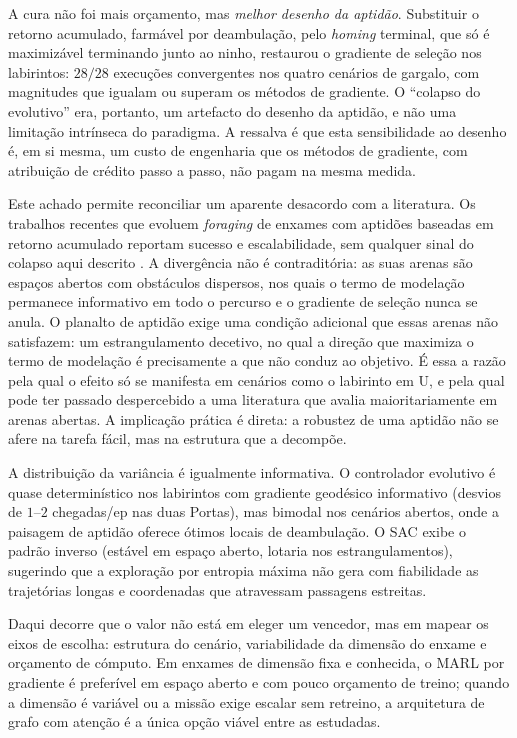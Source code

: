 \documentclass[final,5p,times,twocolumn,authoryear]{elsarticle}
\begin{document}
 A cura não foi mais orçamento, mas \emph{melhor desenho da aptidão}. Substituir o
retorno acumulado, farmável por deambulação, pelo \emph{homing} terminal, que só é
maximizável terminando junto ao ninho, restaurou o gradiente de seleção nos
labirintos: $28/28$ execuções convergentes nos quatro cenários de gargalo, com
magnitudes que igualam ou superam os métodos de gradiente. O
``colapso do evolutivo'' era, portanto, um artefacto do desenho da aptidão, e não
uma limitação intrínseca do paradigma. A ressalva é que esta sensibilidade ao
desenho é, em si mesma, um custo de engenharia que os métodos de gradiente, com
atribuição de crédito passo a passo, não pagam na mesma medida.

 Este achado permite reconciliar um aparente desacordo com a literatura. Os
trabalhos recentes que evoluem \emph{foraging} de enxames com aptidões baseadas em
retorno acumulado reportam sucesso e escalabilidade, sem qualquer sinal do colapso
aqui descrito \citep{zaman2025neat, biteng2025training}. A divergência não é
contraditória: as suas arenas são espaços abertos com obstáculos dispersos, nos
quais o termo de modelação permanece informativo em todo o percurso e o gradiente
de seleção nunca se anula. O planalto de aptidão exige uma condição adicional que
essas arenas não satisfazem: um estrangulamento decetivo, no qual a direção que
maximiza o termo de modelação é precisamente a que não conduz ao objetivo. É essa
a razão pela qual o efeito só se manifesta em cenários como o labirinto em U, e
pela qual pode ter passado despercebido a uma literatura que avalia
maioritariamente em arenas abertas. A implicação prática é direta: a robustez de
uma aptidão não se afere na tarefa fácil, mas na estrutura que a decompõe.

 A distribuição da variância é igualmente informativa. O controlador evolutivo é
quase determinístico nos labirintos com gradiente geodésico informativo (desvios
de $1$--$2$ chegadas/ep nas duas Portas), mas bimodal nos cenários abertos, onde
a paisagem de aptidão oferece ótimos locais de deambulação. O SAC exibe o padrão
inverso (estável em espaço aberto, lotaria nos estrangulamentos),
sugerindo que a exploração por entropia máxima não gera com fiabilidade as
trajetórias longas e coordenadas que atravessam passagens estreitas.

Daqui decorre que o valor não está em eleger um vencedor, mas em mapear os eixos
de escolha: estrutura do cenário, variabilidade da dimensão do enxame e orçamento
de cómputo. Em enxames de dimensão fixa e conhecida, o MARL por gradiente é
preferível em espaço aberto e com pouco orçamento de treino; quando a dimensão é variável ou a
missão exige escalar sem retreino, a arquitetura de grafo com atenção é a única
opção viável entre as estudadas.
\end{document}
